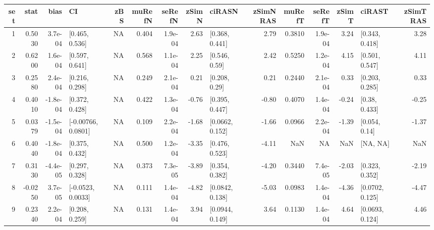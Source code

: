 
\begin{tabular}{r|r|r|l|r|r|r|r|l|r|r|r|r|l|r}
\hline
set & stat & bias & CI & zBS & muRefN & seRefN & zSimN & ciRASN & zSimNRAS & muRefT & seRefT & zSimT & ciRAST & zSimTRAS\\
\hline
1 & 0.5030 & 3.7e-04 & [0.465, 0.536] & NA & 0.404 & 1.9e-04 & 2.63 & [0.368, 0.441] & 2.79 & 0.3810 & 1.9e-04 & 3.24 & [0.343, 0.418] & 3.28\\
\hline
2 & 0.6200 & 1.6e-04 & [0.597, 0.641] & NA & 0.568 & 1.1e-04 & 2.25 & [0.546, 0.59] & 2.42 & 0.5250 & 1.2e-04 & 4.15 & [0.501, 0.547] & 4.11\\
\hline
3 & 0.2580 & 2.4e-04 & [0.216, 0.298] & NA & 0.249 & 2.1e-04 & 0.21 & [0.208, 0.29] & 0.21 & 0.2440 & 2.1e-04 & 0.33 & [0.203, 0.285] & 0.33\\
\hline
4 & 0.4010 & -1.8e-04 & [0.372, 0.428] & NA & 0.422 & 1.3e-04 & -0.76 & [0.395, 0.447] & -0.80 & 0.4070 & 1.4e-04 & -0.24 & [0.38, 0.433] & -0.25\\
\hline
5 & 0.0379 & -1.5e-04 & [-0.00766, 0.0801] & NA & 0.109 & 2.2e-04 & -1.68 & [0.0662, 0.152] & -1.66 & 0.0966 & 2.2e-04 & -1.39 & [0.054, 0.14] & -1.37\\
\hline
6 & 0.4040 & -1.8e-04 & [0.375, 0.432] & NA & 0.500 & 1.2e-04 & -3.35 & [0.476, 0.523] & -4.11 & NaN & NA & NaN & [NA, NA] & NaN\\
\hline
7 & 0.3130 & -4.4e-05 & [0.297, 0.328] & NA & 0.373 & 7.3e-05 & -3.89 & [0.354, 0.382] & -4.20 & 0.3440 & 7.4e-05 & -2.03 & [0.323, 0.352] & -2.19\\
\hline
8 & -0.0250 & 3.7e-05 & [-0.0523, 0.0033] & NA & 0.111 & 1.4e-04 & -4.82 & [0.0842, 0.138] & -5.03 & 0.0983 & 1.4e-04 & -4.36 & [0.0702, 0.125] & -4.47\\
\hline
9 & 0.2340 & 2.2e-04 & [0.208, 0.259] & NA & 0.131 & 1.4e-04 & 3.94 & [0.0944, 0.149] & 3.64 & 0.1130 & 1.4e-04 & 4.64 & [0.0693, 0.124] & 4.46\\
\hline
\end{tabular}
